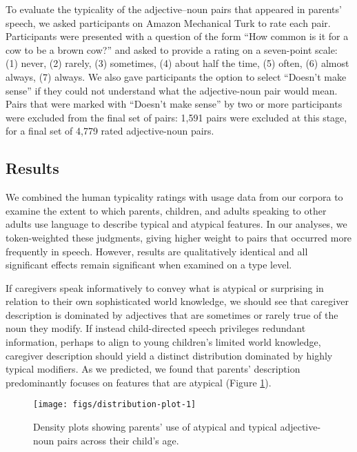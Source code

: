 \documentclass{ucetd}
\begin{document}
To evaluate the typicality of the adjective--noun pairs that appeared in
parents' speech, we asked participants on Amazon Mechanical Turk to rate
each pair. Participants were presented with a question of the form ``How
common is it for a cow to be a brown cow?'' and asked to provide a
rating on a seven-point scale: (1) never, (2) rarely, (3) sometimes, (4)
about half the time, (5) often, (6) almost always, (7) always. We also
gave participants the option to select ``Doesn't make sense'' if they
could not understand what the adjective-noun pair would mean. Pairs that
were marked with ``Doesn't make sense'' by two or more participants were
excluded from the final set of pairs: 1,591 pairs were excluded at this
stage, for a final set of 4,779 rated adjective-noun pairs.

\hypertarget{results}{%
\subsection{Results}\label{results}}

We combined the human typicality ratings with usage data from our
corpora to examine the extent to which parents, children, and adults
speaking to other adults use language to describe typical and atypical
features. In our analyses, we token-weighted these judgments, giving
higher weight to pairs that occurred more frequently in speech. However,
results are qualitatively identical and all significant effects remain
significant when examined on a type level.

If caregivers speak informatively to convey what is atypical or
surprising in relation to their own sophisticated world knowledge, we
should see that caregiver description is dominated by adjectives that
are sometimes or rarely true of the noun they modify. If instead
child-directed speech privileges redundant information, perhaps to align
to young children's limited world knowledge, caregiver description
should yield a distinct distribution dominated by highly typical
modifiers. As we predicted, we found that parents' description
predominantly focuses on features that are atypical (Figure
\ref{fig:distribution-plot}).

\begin{figure}[tb]

{\centering \texttt{[image: figs/distribution-plot-1]} 

}

\caption{Density plots showing parents' use of atypical and typical adjective-noun pairs across their child's age.}\label{fig:distribution-plot}
\end{figure}
\end{document}
